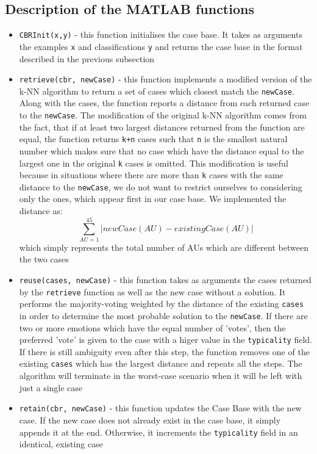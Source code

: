 \documentclass[a4paper]{article}
\begin{document}
\subsection{Description of the MATLAB functions}
\begin{itemize}
\item \texttt{CBRInit(x,y)} - this function initialises the case base. It takes as arguments the examples \texttt{x} and classifications \texttt{y} and returns the case base in the format described in the previous subsection
\item \texttt{retrieve(cbr, newCase)} - this function implements a modified version of the k-NN algorithm to return a set of cases which closest match the \texttt{newCase}. Along with the cases, the function reports a distance from each returned case to the \texttt{newCase}. The modification of the original k-NN algorithm comes from the fact, that if at least two largest distances returned from the function are equal, the function returns \texttt{k+n} cases such that \texttt{n} is the smallest natural number which makes sure that no case which have the distance equal to the largest one in the original \texttt{k} cases is omitted. This modification is useful because in situations where there are more than \texttt{k} cases with the same distance to the \texttt{newCase}, we do not want to restrict ourselves to considering only the ones, which appear first in our case base. We implemented the distance as:
\begin{equation}
\sum_{AU = 1}^{45} \left | newCase(AU) - existingCase(AU)\right |
\end{equation}
which simply represents the total number of AUs which are different between the two cases
\item \texttt{reuse(cases, newCase)} - this function takes as arguments the cases returned by the \texttt{retrieve} function as well as the new case without a solution. It performs the majority-voting weighted by the distance of the existing \texttt{cases} in order to determine the most probable solution to the \texttt{newCase}. If there are two or more emotions which have the equal number of 'votes', then the preferred 'vote' is given to the case with a higer value in the \texttt{typicality} field. If there is still ambiguity even after this step, the function removes one of the existing \texttt{cases} which has the largest distance and repeats all the steps. The algorithm will terminate in the worst-case scenario when it will be left with just a single case
\item \texttt{retain(cbr, newCase)} - this function updates the Case Base with the new case. If the new case does not already exist in the case base, it simply appends it at the end. Otherwise, it increments the \texttt{typicality} field in an identical, existing case

\end{itemize}
\end{document}
